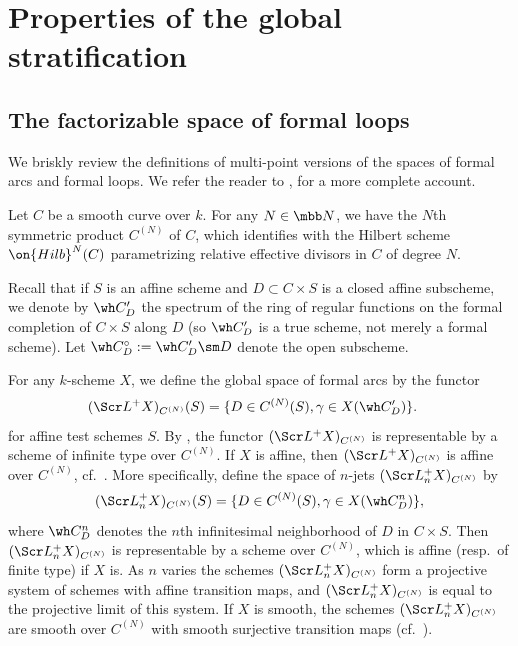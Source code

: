 \documentclass[final]{amsart}
\theoremstyle{remark}
\theoremstyle{definition}
\numberwithin{equation}{section}
\begin{document}
\appendix 

\section{Properties of the global stratification} \label{appendix:A}

\subsection{The factorizable space of formal loops} \label{sect:multijet}

We briskly review the definitions of multi-point versions of the 
spaces of formal arcs and formal loops. We refer the reader to \cite{KV}, \cite[\S 3.1]{Xinwen} for a more complete account.  

Let $C$ be a smooth curve over $k$. 
For any $N \in \mbb N$, we have the $N$th symmetric product
$C^{(N)}$ of $C$, which identifies with the Hilbert scheme $\on{Hilb}^N(C)$
parametrizing relative effective divisors in $C$ of degree $N$.

Recall that if $S$ is an affine scheme and $D \subset C\times S$ 
is a closed affine subscheme, we denote by $\wh C'_D$ the 
spectrum of the ring of regular functions
on the formal completion of $C\times S$ along $D$ (so $\wh C'_D$ is a true scheme, not merely a formal scheme). 
Let $\wh C^\circ_D := \wh C'_D \sm D$ denote
the open subscheme. 

For any $k$-scheme $X$, we define the global space of formal arcs
by the functor
\begin{align*} 
(\Scr L^+ X)_{C^{(N)}}(S) & = \{ D \in C^{(N)}(S), \gamma \in X(\wh C'_D) \}. 
\end{align*}
for affine test schemes $S$. 
By \cite[Proposition 2.4.1]{KV}, the functor $(\Scr L^+ X)_{C^{(N)}}$ is representable by a scheme of infinite type over $C^{(N)}$.
If $X$ is affine, then $(\Scr L^+ X)_{C^{(N)}}$ is affine
over $C^{(N)}$, cf.~\cite[2.4.3]{KV}. 
More specifically, 
define the space of $n$-jets $(\Scr L^+_n X)_{C^{(N)}}$ by 
\[ (\Scr L^+_n X)_{C^{(N)}}(S) = \{ D\in C^{(N)}(S), \gamma \in X(\wh C^n_D) \}, \]
where $\wh C^n_D$ denotes the $n$th infinitesimal neighborhood of $D$
in $C\times S$. Then $(\Scr L^+_n X)_{C^{(N)}}$ is representable
by a scheme over $C^{(N)}$, which is affine (resp.~of finite type) if $X$ is.  As $n$ varies 
the schemes $(\Scr L^+_n X)_{C^{(N)}}$ form a projective system of schemes 
with affine transition maps, and 
$(\Scr L^+_n X)_{C^{(N)}}$ is equal to the projective limit of this system.
If $X$ is smooth, the schemes $(\Scr L^+_n X)_{C^{(N)}}$ are
smooth over $C^{(N)}$ with smooth surjective transition maps (cf.~\cite[Lemma 2.5.1]{cpsii}).
\end{document}
